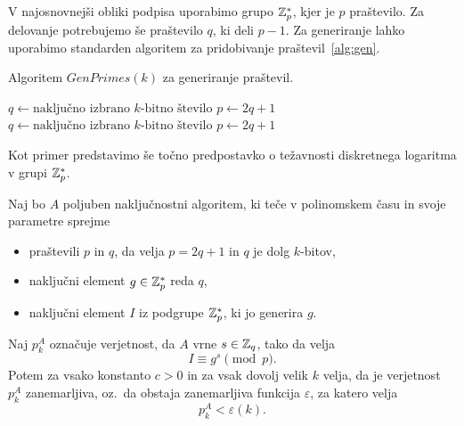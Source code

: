 \begin{primer}
\label{primer:gen-zp}
    V najosnovnejši obliki podpisa uporabimo grupo $\mathbb Z_p^*$, kjer je $p$ praštevilo. Za delovanje
    potrebujemo še praštevilo $q$, ki deli $p - 1$. Za generiranje lahko uporabimo standarden algoritem
    za pridobivanje praštevil~\ref{alg:gen}.
    \begin{algorithm}
        \caption{Algoritem $GenPrimes(k)$ za generiranje praštevil.}
        \label{alg:gen}
        \begin{algorithmic}
            \State $q \gets \text{naključno izbrano $k$-bitno število}$
            \State $p \gets 2q + 1$
                \State $q \gets \text{naključno izbrano $k$-bitno število}$
                \State $p \gets 2q + 1$
            \EndWhile
            \State {}
        \end{algorithmic}
    \end{algorithm}

    Kot primer predstavimo še točno predpostavko o težavnosti diskretnega logaritma v grupi $\mathbb Z_p^*$.
    \begin{definicija}
    \label{def:asm_dlp}
        Naj bo $A$ poljuben naključnostni algoritem, ki teče v polinomskem času in svoje parametre sprejme 
        \begin{itemize}
            \item praštevili $p$ in $q$, da velja $p = 2q + 1$ in $q$ je dolg $k$-bitov,
            \item naključni element $g \in \mathbb Z_p^*$ reda $q$,
            \item naključni element $I$ iz podgrupe $\mathbb Z_p^*$, ki jo generira $g$.
        \end{itemize}
        Naj $p_k^A$ označuje verjetnost, da $A$ vrne $s \in \mathbb Z_q$, tako da velja
        $$
        I \equiv g^s \pmod p.
        $$
        Potem za vsako konstanto $c > 0$ in za vsak dovolj velik $k$ velja, da je verjetnost $p_k^A$
        zanemarljiva, oz.\ da obstaja zanemarljiva funkcija $\varepsilon$, za katero velja
        $$ 
        p_k^A < \varepsilon(k).
        $$
    \end{definicija}

\end{primer}

